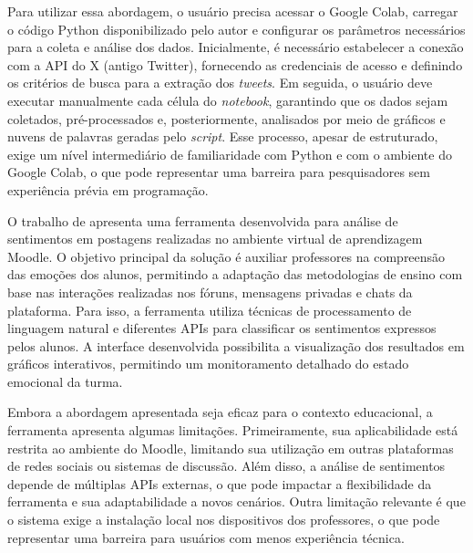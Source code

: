 \documentclass[
	12pt,				%
	oneside,			%
	a4paper,			%
	english,			%
	french,				%
	spanish,			%
	brazil				%
	]{abntex2}
\begin{document}
Para utilizar essa abordagem, o usuário precisa acessar o Google Colab,
carregar o código Python disponibilizado pelo autor e configurar os
parâmetros necessários para a coleta e análise dos dados. Inicialmente,
é necessário estabelecer a conexão com a API do X (antigo Twitter),
fornecendo as credenciais de acesso e definindo os critérios de busca
para a extração dos \emph{tweets}. Em seguida, o usuário deve executar
manualmente cada célula do \emph{notebook}, garantindo que os dados
sejam coletados, pré-processados e, posteriormente, analisados por meio
de gráficos e nuvens de palavras geradas pelo \emph{script}. Esse
processo, apesar de estruturado, exige um nível intermediário de
familiaridade com Python e com o ambiente do Google Colab, o que pode
representar uma barreira para pesquisadores sem experiência prévia em
programação.

O trabalho de  apresenta uma ferramenta
desenvolvida para análise de sentimentos em postagens realizadas no
ambiente virtual de aprendizagem Moodle. O objetivo principal da solução
é auxiliar professores na compreensão das emoções dos alunos, permitindo
a adaptação das metodologias de ensino com base nas interações
realizadas nos fóruns, mensagens privadas e chats da plataforma. Para
isso, a ferramenta utiliza técnicas de processamento de linguagem
natural e diferentes APIs para classificar os sentimentos expressos
pelos alunos. A interface desenvolvida possibilita a visualização dos
resultados em gráficos interativos, permitindo um monitoramento
detalhado do estado emocional da turma.

Embora a abordagem apresentada seja eficaz para o contexto educacional,
a ferramenta apresenta algumas limitações. Primeiramente, sua
aplicabilidade está restrita ao ambiente do Moodle, limitando sua
utilização em outras plataformas de redes sociais ou sistemas de
discussão. Além disso, a análise de sentimentos depende de múltiplas
APIs externas, o que pode impactar a flexibilidade da ferramenta e sua
adaptabilidade a novos cenários. Outra limitação relevante é que o
sistema exige a instalação local nos dispositivos dos professores, o que
pode representar uma barreira para usuários com menos experiência
técnica.
\end{document}
